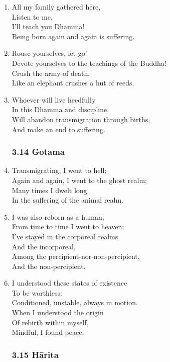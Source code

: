 \documentclass[10pt, openany]{book}
\begin{document}
\begin{enumerate}
\item All my family gathered here,\\
Listen to me,\\
I’ll teach you Dhamma!\\
Being born again and again is suffering.

\item Rouse yourselves, let go!\\
Devote yourselves to the teachings of the Buddha!\\
Crush the army of death,\\
Like an elephant crushes a hut of reeds.

\item Whoever will live heedfully\\
In this Dhamma and discipline,\\
Will abandon transmigration through births,\\
And make an end to suffering.

\subsubsection*{3.14 Gotama}

\item Transmigrating, I went to hell;\\
Again and again, I went to the ghost realm;\\
Many times I dwelt long\\
In the suffering of the animal realm.

\item I was also reborn as a human;\\
From time to time I went to heaven;\\
I’ve stayed in the corporeal realms \\
And the incorporeal,\\
Among the percipient-nor-non-percipient, \\
And the non-percipient.

\item I understood these states of existence \\
To be worthless:\\
Conditioned, unstable, always in motion.\\
When I understood the origin \\
Of rebirth within myself,\\
Mindful, I found peace.

\subsubsection*{3.15 Hārita}


\end{enumerate}
\end{document}

